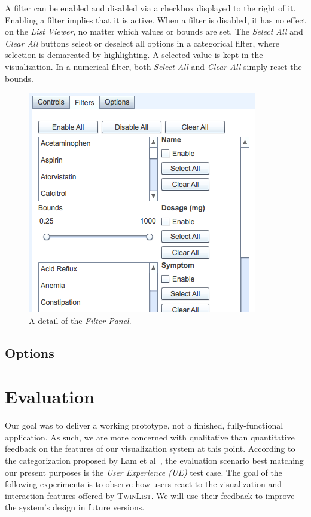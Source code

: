 \documentclass{chi2009}
\newcommand{\TwinList}{\textsc{TwinList}}
\newcommand{\ListViewer}{\textit{List Viewer}}
\newcommand{\Filters}{\textit{Filter Panel}}
\begin{document}
A filter can be enabled and disabled via a checkbox displayed to the right of it. Enabling a filter implies that it is active. When a filter is disabled, it has no effect on the \ListViewer, no matter which values or bounds are set. The \textit{Select All} and \textit{Clear All} buttons select or deselect all options in a categorical filter, where selection is demarcated by highlighting. A selected value is kept in the visualization. In a numerical filter, both \textit{Select All} and \textit{Clear All} simply reset the bounds.

\begin{figure}
\begin{center}
\includegraphics[width=1\linewidth]{img/filters.png}
\end{center}
   \caption{A detail of the \Filters.}
   \label{fig:filters}
\end{figure}

\subsection{Options}

\section{Evaluation}
Our goal was to deliver a working prototype, not a finished, fully-functional application. As such, we are more concerned with qualitative than quantitative feedback on the features of our visualization system at this point. According to the categorization proposed by Lam et al~\cite{lam-bertini-isenberg-plaisant-carpendale-2011}, the evaluation scenario best matching our present purposes is the \textit{User Experience (UE)} test case. The goal of the following experiments is to observe how users react to the visualization and interaction features offered by \TwinList. We will use their feedback to improve the system's design in future versions.
\end{document}
